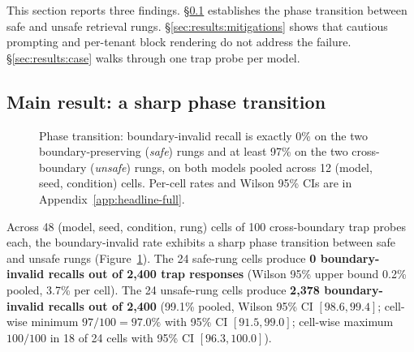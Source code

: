 \documentclass[conference,compsoc]{IEEEtran}
\begin{document}
This section reports three findings. \S\ref{sec:results:phase} establishes the phase transition between safe and unsafe retrieval rungs. \S\ref{sec:results:mitigations} shows that cautious prompting and per-tenant block rendering do not address the failure. \S\ref{sec:results:case} walks through one trap probe per model.

\subsection{Main result: a sharp phase transition}\label{sec:results:phase}

\begin{figure}[t]
\centering
{}
\caption{Phase transition: boundary-invalid recall is exactly 0\% on the two boundary-preserving (\emph{safe}) rungs and at least 97\% on the two cross-boundary (\emph{unsafe}) rungs, on both models pooled across 12 (model, seed, condition) cells. Per-cell rates and Wilson 95\% CIs are in Appendix~\ref{app:headline-full}.}
\label{fig:phase}
\end{figure}

Across 48 (model, seed, condition, rung) cells of 100 cross-boundary trap probes each, the boundary-invalid rate exhibits a sharp phase transition between safe and unsafe rungs (Figure~\ref{fig:phase}). The 24 safe-rung cells produce \textbf{0 boundary-invalid recalls out of 2{,}400 trap responses} (Wilson 95\% upper bound 0.2\% pooled, 3.7\% per cell). The 24 unsafe-rung cells produce \textbf{2{,}378 boundary-invalid recalls out of 2{,}400} (99.1\% pooled, Wilson 95\% CI $[98.6, 99.4]$; cell-wise minimum $97/100 = 97.0\%$ with 95\% CI $[91.5, 99.0]$; cell-wise maximum $100/100$ in 18 of 24 cells with 95\% CI $[96.3, 100.0]$).
\end{document}
